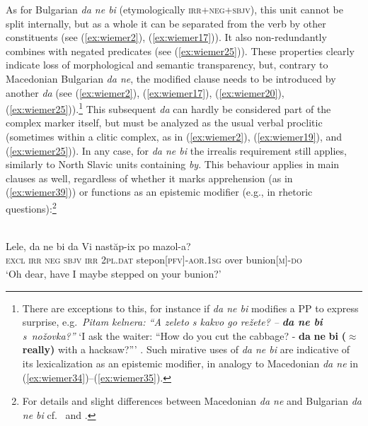 \documentclass[output=paper,colorlinks,citecolor=brown]{langscibook}
\begin{document}
As for Bulgarian \textit{da ne bi} (etymologically \textsc{irr+neg+sbjv}), this unit cannot be split internally, but as a whole it can be separated from the verb by other constituents (see (\ref{ex:wiemer2}), (\ref{ex:wiemer17})). It also non-redundantly combines with negated predicates (see (\ref{ex:wiemer25})). These properties clearly indicate loss of morphological and semantic transparency, but, contrary to Macedonian Bulgarian \textit{da ne}, the modified clause needs to be introduced by another \textit{da} (see (\ref{ex:wiemer2}), (\ref{ex:wiemer17}), (\ref{ex:wiemer20}), (\ref{ex:wiemer25})).\footnote{There are exceptions to this, for instance if \textit{da ne bi} modifies a PP to express surprise, e.g.\ \textit{Pitam kelnera: ``A zeleto s kakvo go režete? –} \textit{\textbf{da ne bi} s~nožovka?''} `I ask the waiter: ``How do you cut the cabbage? - \textbf{da} \textbf{ne} \textbf{bi} \textbf{(${\approx}$ really)} with a hacksaw?''' \citep[148]{Ivanova2014}. Such mirative uses of \textit{da ne bi} are indicative of its lexicalization as an epistemic modifier, in analogy to Macedonian \textit{da ne} in (\ref{ex:wiemer34})--(\ref{ex:wiemer35}).} This subsequent \textit{da} can hardly be considered part of the complex marker itself, but must be analyzed as the usual verbal proclitic (sometimes within a clitic complex, as in (\ref{ex:wiemer2}), (\ref{ex:wiemer19}), and (\ref{ex:wiemer25})). In any case, for \textit{da ne bi} the irrealis requirement still applies, similarly to North Slavic units containing \textit{by}. This behaviour applies in main clauses as well, regardless of whether it marks apprehension (as in (\ref{ex:wiemer39})) or functions as an epistemic modifier (e.g., in rhetoric questions):\footnote{For details and slight differences between Macedonian \textit{da ne} and Bulgarian \textit{da ne bi} cf.\ \citet[147--150]{Ivanova2014} and \citet[70]{MitkovskaEtAl2017}.}


\ea 
\label{ex:wiemer39} 
 \\
\gll Lele, da ne bi da Vi nastăp-ix po mazol-a? \\
\textsc{excl} \textsc{irr} \textsc{neg} \textsc{sbjv} \textsc{irr} \textsc{2pl.dat} step\textunderscore on\textsc{[pfv]-aor.1sg} over bunion\textsc{[m]-do} \\
\glt `Oh dear, have I maybe stepped on your bunion?' \\
\z
\end{document}
